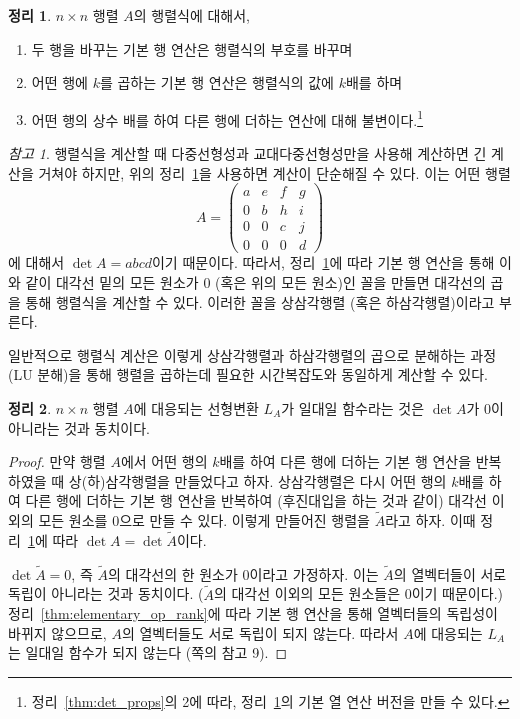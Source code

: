 \documentclass[unfonts,oneside,a4paper]{oblivoir}
\theoremstyle{definition}
\theoremstyle{theorem}
\newtheorem{theorem}{정리}[section]
\theoremstyle{theorem}
\theoremstyle{remark}
\newtheorem*{remark}{참고}
\theoremstyle{remark}
\theoremstyle{remark}
\theoremstyle{remark}
\begin{document}
\begin{theorem} \label{thm:ero_det}
    $n \times n$ 행렬 $A$의 행렬식에 대해서,
    \begin{enumerate}
        \item 두 행을 바꾸는 기본 행 연산은 행렬식의 부호를 바꾸며
        \item 어떤 행에 $k$를 곱하는 기본 행 연산은 행렬식의 값에 $k$배를 하며
        \item 어떤 행의 상수 배를 하여 다른 행에 더하는 연산에 대해 불변이다.\footnote{정리~\ref{thm:det_props}의 2에 따라, 정리~\ref{thm:ero_det}의 기본 열 연산 버전을 만들 수 있다.}
    \end{enumerate}
\end{theorem}

\begin{remark}
    행렬식을 계산할 때 다중선형성과 교대다중선형성만을 사용해 계산하면 긴 계산을 거쳐야 하지만, 위의 정리~\ref{thm:ero_det}을 사용하면 계산이 단순해질 수 있다.
    이는 어떤 행렬
    \begin{equation*}
        A =\begin{pmatrix}a&e&f&g\\0&b&h&i\\0&0&c&j\\0&0&0&d\end{pmatrix}
    \end{equation*}
    에 대해서 $\det A = abcd$이기 때문이다.
    따라서, 정리~\ref{thm:ero_det}에 따라 기본 행 연산을 통해 이와 같이 대각선 밑의 모든 원소가 0 (혹은 위의 모든 원소)인 꼴을 만들면 대각선의 곱을 통해 행렬식을 계산할 수 있다.
    이러한 꼴을 상삼각행렬 (혹은 하삼각행렬)이라고 부른다.

    일반적으로 행렬식 계산은 이렇게 상삼각행렬과 하삼각행렬의 곱으로 분해하는 과정(LU 분해)을 통해 행렬을 곱하는데 필요한 시간복잡도와 동일하게 계산할 수 있다.
\end{remark}

\begin{theorem} \label{thm:nonzero_det}
    $n \times n$ 행렬 $A$에 대응되는 선형변환 $L_A$가 일대일 함수라는 것은 $\det A$가 0이 아니라는 것과 동치이다.
\end{theorem}
\begin{proof}
    만약 행렬 $A$에서 어떤 행의 $k$배를 하여 다른 행에 더하는 기본 행 연산을 반복하였을 때 상(하)삼각행렬을 만들었다고 하자.
    상삼각행렬은 다시 어떤 행의 $k$배를 하여 다른 행에 더하는 기본 행 연산을 반복하여 (후진대입을 하는 것과 같이) 대각선 이외의 모든 원소를 0으로 만들 수 있다.
    이렇게 만들어진 행렬을 $\tilde A$라고 하자.
    이때 정리~\ref{thm:ero_det}에 따라 $\det A = \det \tilde A$이다.

    $\det \tilde A = 0$, 즉 $\tilde A$의 대각선의 한 원소가 0이라고 가정하자.
    이는 $\tilde A$의 열벡터들이 서로 독립이 아니라는 것과 동치이다. ($\tilde A$의 대각선 이외의 모든 원소들은 0이기 때문이다.)
    정리~\ref{thm:elementary_op_rank}에 따라 기본 행 연산을 통해 열벡터들의 독립성이 바뀌지 않으므로, $A$의 열벡터들도 서로 독립이 되지 않는다.
    따라서 $A$에 대응되는 $L_A$는 일대일 함수가 되지 않는다 (\pageref{page:equiv_remark}쪽의 참고 9).
\end{proof}
\end{document}
